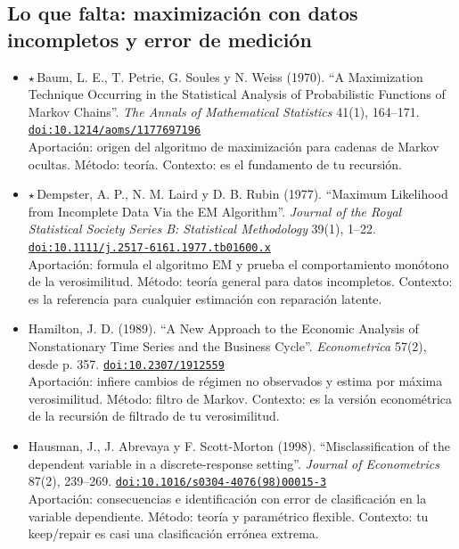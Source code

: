 \documentclass[11pt]{article}
\begin{document}
\subsection*{Lo que falta: maximización con datos incompletos y error de medición}
\begin{itemize}
\item $\star$\,Baum, L. E., T. Petrie, G. Soules y N. Weiss (1970). ``A Maximization Technique Occurring in the Statistical Analysis of Probabilistic Functions of Markov Chains''. \textit{The Annals of Mathematical Statistics} 41(1), 164--171. \href{https://doi.org/10.1214/aoms/1177697196}{\texttt{doi:10.1214/aoms/1177697196}}\\
Aportación: origen del algoritmo de maximización para cadenas de Markov ocultas. Método: teoría. Contexto: es el fundamento de tu recursión.
\item $\star$\,Dempster, A. P., N. M. Laird y D. B. Rubin (1977). ``Maximum Likelihood from Incomplete Data Via the EM Algorithm''. \textit{Journal of the Royal Statistical Society Series B: Statistical Methodology} 39(1), 1--22. \href{https://doi.org/10.1111/j.2517-6161.1977.tb01600.x}{\texttt{doi:10.1111/j.2517-6161.1977.tb01600.x}}\\
Aportación: formula el algoritmo EM y prueba el comportamiento monótono de la verosimilitud. Método: teoría general para datos incompletos. Contexto: es la referencia para cualquier estimación con reparación latente.
\item Hamilton, J. D. (1989). ``A New Approach to the Economic Analysis of Nonstationary Time Series and the Business Cycle''. \textit{Econometrica} 57(2), desde p. 357. \href{https://doi.org/10.2307/1912559}{\texttt{doi:10.2307/1912559}}\\
Aportación: infiere cambios de régimen no observados y estima por máxima verosimilitud. Método: filtro de Markov. Contexto: es la versión econométrica de la recursión de filtrado de tu verosimilitud.
\item Hausman, J., J. Abrevaya y F. Scott-Morton (1998). ``Misclassification of the dependent variable in a discrete-response setting''. \textit{Journal of Econometrics} 87(2), 239--269. \href{https://doi.org/10.1016/s0304-4076(98)00015-3}{\texttt{doi:10.1016/s0304-4076(98)00015-3}}\\
Aportación: consecuencias e identificación con error de clasificación en la variable dependiente. Método: teoría y paramétrico flexible. Contexto: tu keep/repair es casi una clasificación errónea extrema.

\end{itemize}
\end{document}
